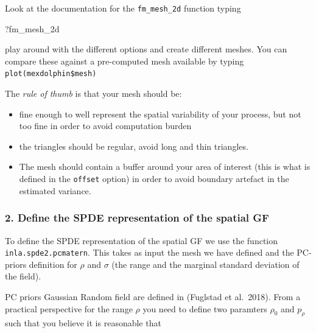 \documentclass[
  letterpaper,
  DIV=11,
  numbers=noendperiod]{scrartcl}
\newenvironment{Shaded}{\begin{snugshade}}{\end{snugshade}}
\newcommand{\NormalTok}[1]{\textcolor[rgb]{0.00,0.23,0.31}{#1}}
\providecommand{\tightlist}{%
  \setlength{\itemsep}{0pt}\setlength{\parskip}{0pt}}\usepackage{longtable,booktabs,array}
\begin{document}
\begin{tcolorbox}[enhanced jigsaw, coltitle=black, breakable, opacityback=0, colbacktitle=quarto-callout-warning-color!10!white, leftrule=.75mm, opacitybacktitle=0.6, title={Task}, titlerule=0mm, toptitle=1mm, bottomtitle=1mm, left=2mm, colback=white, arc=.35mm, colframe=quarto-callout-warning-color-frame, rightrule=.15mm, bottomrule=.15mm, toprule=.15mm]

Look at the documentation for the \texttt{fm\_mesh\_2d} function typing

\begin{Shaded}
\begin{Highlighting}[]
\NormalTok{?fm\_mesh\_2d}
\end{Highlighting}
\end{Shaded}

play around with the different options and create different meshes. You
can compare these against a pre-computed mesh available by typing
\texttt{plot(mexdolphin\$mesh)}

The \emph{rule of thumb} is that your mesh should be:

\begin{itemize}
\tightlist
\item
  fine enough to well represent the spatial variability of your process,
  but not too fine in order to avoid computation burden
\item
  the triangles should be regular, avoid long and thin triangles.
\item
  The mesh should contain a buffer around your area of interest (this is
  what is defined in the \texttt{offset} option) in order to avoid
  boundary artefact in the estimated variance.
\end{itemize}

\end{tcolorbox}

\subsubsection{2. Define the SPDE representation of the spatial
GF}\label{define-the-spde-representation-of-the-spatial-gf}

To define the SPDE representation of the spatial GF we use the function
\texttt{inla.spde2.pcmatern}. This takes as input the mesh we have
defined and the PC-priors definition for \(\rho\) and \(\sigma\) (the
range and the marginal standard deviation of the field).

PC priors Gaussian Random field are defined in (Fuglstad et al.~2018).
From a practical perspective for the range \(\rho\) you need to define
two paramters \(\rho_0\) and \(p_{\rho}\) such that you believe it is
reasonable that
\end{document}
